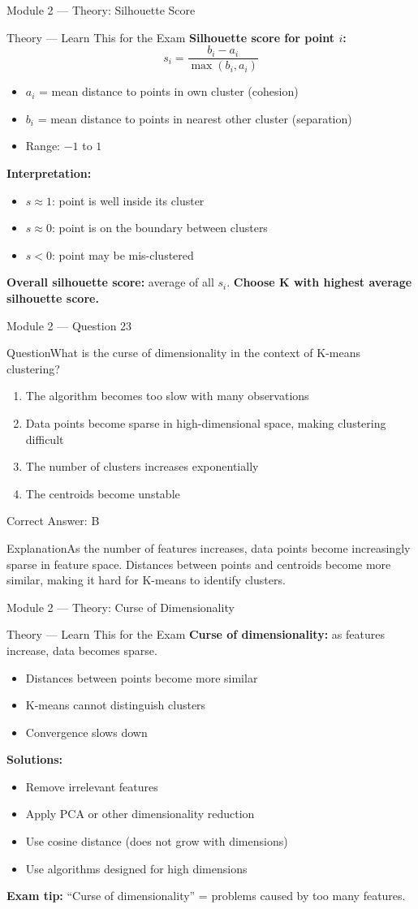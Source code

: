 \documentclass[aspectratio=169,10pt]{beamer}
\newcommand{\question}[1]{\begin{block}{Question}#1\end{block}}
\newcommand{\options}[4]{%
	\begin{enumerate}[label=\Alph*.,leftmargin=*]
		\item #1
		\item #2
		\item #3
		\item #4
	\end{enumerate}
}
\newcommand{\answerbox}[1]{\begin{exampleblock}{Correct Answer: #1}\end{exampleblock}}
\newcommand{\explain}[1]{\begin{block}{Explanation}#1\end{block}}
\newcommand{\theory}[1]{%
	\begin{block}{Theory --- Learn This for the Exam}
		\small #1
	\end{block}
}
\begin{document}
	\begin{frame}{Module 2 --- Theory: Silhouette Score}
		\theory{
			\textbf{Silhouette score for point $i$:}
			\[
			s_i = \frac{b_i - a_i}{\max(b_i, a_i)}
			\]
			\begin{itemize}
				\item $a_i$ = mean distance to points in own cluster (cohesion)
				\item $b_i$ = mean distance to points in nearest other cluster (separation)
				\item Range: $-1$ to $1$
			\end{itemize}
			\textbf{Interpretation:}
			\begin{itemize}
				\item $s \approx 1$: point is well inside its cluster
				\item $s \approx 0$: point is on the boundary between clusters
				\item $s < 0$: point may be mis-clustered
			\end{itemize}
			\textbf{Overall silhouette score:} average of all $s_i$.
			\textbf{Choose K with highest average silhouette score.}
		}
	\end{frame}
	
	\begin{frame}{Module 2 --- Question 23}
		\question{What is the curse of dimensionality in the context of K-means clustering?}
		\options{The algorithm becomes too slow with many observations}{Data points become sparse in high-dimensional space, making clustering difficult}{The number of clusters increases exponentially}{The centroids become unstable}
		\answerbox{B}
		\explain{As the number of features increases, data points become increasingly sparse in feature space. Distances between points and centroids become more similar, making it hard for K-means to identify clusters.}
	\end{frame}
	
	\begin{frame}{Module 2 --- Theory: Curse of Dimensionality}
		\theory{
			\textbf{Curse of dimensionality:} as features increase, data becomes sparse.
			\begin{itemize}
				\item Distances between points become more similar
				\item K-means cannot distinguish clusters
				\item Convergence slows down
			\end{itemize}
			\textbf{Solutions:}
			\begin{itemize}
				\item Remove irrelevant features
				\item Apply PCA or other dimensionality reduction
				\item Use cosine distance (does not grow with dimensions)
				\item Use algorithms designed for high dimensions
			\end{itemize}
			\textbf{Exam tip:} ``Curse of dimensionality'' = problems caused by too many features.
		}
	\end{frame}
	
\end{document}
